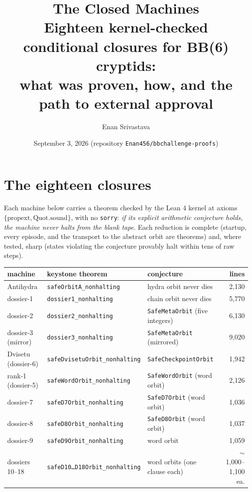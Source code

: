 \documentclass[11pt]{article}
\title{\bfseries The Closed Machines\\
\large Eighteen kernel-checked conditional closures for BB(6) cryptids:\\
what was proven, how, and the path to external approval}
\author{Enan Srivastava}
\date{September 3, 2026 \quad (repository \texttt{Enan456/bbchallenge-proofs})}
\begin{document}
\maketitle

\section*{The eighteen closures}

Each machine below carries a theorem checked by the Lean 4 kernel at
axioms $\{\mathrm{propext}, \mathrm{Quot.sound}\}$, with no
\texttt{sorry}: \emph{if its explicit arithmetic conjecture holds,
the machine never halts from the blank tape}. Each reduction is
complete (startup, every episode, and the transport to the abstract
orbit are theorems) and, where tested, sharp (states violating the
conjecture provably halt within tens of raw steps).

\begin{center}\small
\begin{tabular}{lllr}
\toprule
machine & keystone theorem & conjecture & lines \\
\midrule
Antihydra & \texttt{safeOrbitA\_nonhalting} & hydra orbit never dies & 2{,}130 \\
dossier-1 & \texttt{dossier1\_nonhalting} & chain orbit never dies & 5{,}770 \\
dossier-2 & \texttt{dossier2\_nonhalting} & \texttt{SafeMetaOrbit} (five integers) & 6{,}130 \\
dossier-3 (mirror) & \texttt{dossier3\_nonhalting} & \texttt{SafeMetaOrbit} (mirrored) & 9{,}020 \\
Dvisetu (dossier-6) & \texttt{safeDvisetuOrbit\_nonhalting} & \texttt{SafeCheckpointOrbit} & 1{,}942 \\
rank-1 (dossier-5) & \texttt{safeWordOrbit\_nonhalting} & \texttt{SafeWordOrbit} (word orbit) & 2{,}126 \\
dossier-7 & \texttt{safeD7Orbit\_nonhalting} & \texttt{SafeD7Orbit} (word orbit) & 1{,}036 \\
dossier-8 & \texttt{safeD8Orbit\_nonhalting} & \texttt{SafeD8Orbit} (word orbit) & 1{,}037 \\
dossier-9 & \texttt{safeD9Orbit\_nonhalting} & word orbit & 1{,}059 \\
dossiers 10--18 & \texttt{safeD10\ldots{}D18Orbit\_nonhalting} & word orbits (one clause each) & $\sim$1{,}000--1{,}100 ea. \\
\bottomrule
\end{tabular}
\end{center}
\end{document}
